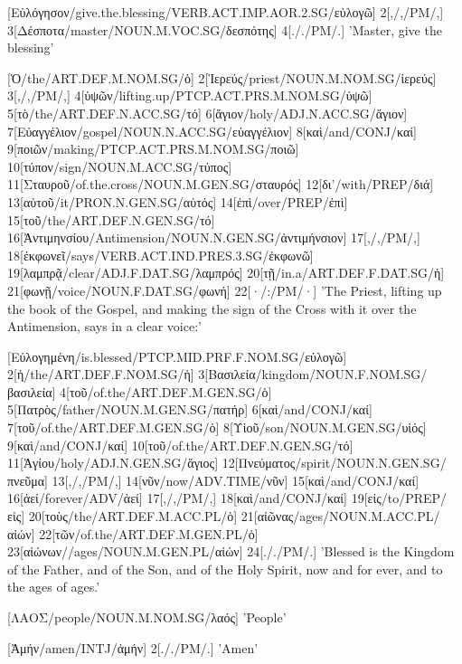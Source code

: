 \documentclass[extrafontsizes,17pt]{memoir}
\begin{document}
\a

[Εὐλόγησον/give.the.blessing/VERB.ACT.IMP.AOR.2.SG/εὐλογῶ] 
2[,/,/PM/,]
3[Δέσποτα/master/NOUN.M.VOC.SG/δεσπότης]
4[././PM/.]
\glft
'Master, give the blessing'
\endgl

\a

[Ὁ/the/ART.DEF.M.NOM.SG/ὁ]
2[Ἱερεύς/priest/NOUN.M.NOM.SG/ἱερεύς]
3[,/,/PM/,]
4[ὑψῶν/lifting.up/PTCP.ACT.PRS.M.NOM.SG/ὑψῶ]
5[τὸ/the/ART.DEF.N.ACC.SG/τό]
6[ἅγιον/holy/ADJ.N.ACC.SG/ἅγιον]
7[Εὐαγγέλιον/gospel/NOUN.N.ACC.SG/εὐαγγέλιον]
8[καὶ/and/CONJ/καί]
9[ποιῶν/making/PTCP.ACT.PRS.M.NOM.SG/ποιῶ]
10[τύπον/sign/NOUN.M.ACC.SG/τύπος]
11[Σταυροῦ/of.the.cross/NOUN.M.GEN.SG/σταυρός]
12[δι'/with/PREP/διά]
13[αὐτοῦ/it/PRON.N.GEN.SG/αὐτός]
14[ἐπὶ/over/PREP/ἐπὶ]
15[τοῦ/the/ART.DEF.N.GEN.SG/τό]
16[Ἀντιμηνσίου/Antimension/NOUN.N.GEN.SG/ἀντιμήνσιον]
17[,/,/PM/,]
18[ἐκφωνεῖ/says/VERB.ACT.IND.PRES.3.SG/ἐκφωνῶ]
19[λαμπρᾷ/clear/ADJ.F.DAT.SG/λαμπρός]
20[τῇ/in.a/ART.DEF.F.DAT.SG/ἡ]
21[φωνῇ/voice/NOUN.F.DAT.SG/φωνή]
22[·/:/PM/·]
\glft
'The Priest, lifting up the book of the Gospel, and
making the sign of the Cross with it over the Antimension,
says in a clear voice:'
\endgl

\a

[Εὐλογημένη/is.blessed/PTCP.MID.PRF.F.NOM.SG/εὐλογῶ]
2[ἡ/the/ART.DEF.F.NOM.SG/ἡ]
3[Βασιλεία/kingdom/NOUN.F.NOM.SG/βασιλεία]
4[τοῦ/of.the/ART.DEF.M.GEN.SG/ὁ]
5[Πατρὸς/father/NOUN.M.GEN.SG/πατήρ]
6[καὶ/and/CONJ/καί]
7[τοῦ/of.the/ART.DEF.M.GEN.SG/ὁ] 
8[Υἱοῦ/son/NOUN.M.GEN.SG/υἱός]
9[καὶ/and/CONJ/καί]
10[τοῦ/of.the/ART.DEF.N.GEN.SG/τό]
11[Ἁγίου/holy/ADJ.N.GEN.SG/ἅγιος]
12[Πνεύματος/spirit/NOUN.N.GEN.SG/πνεῦμα]
13[,/,/PM/,]
14[νῦν/now/ADV.TIME/νῦν]
15[καὶ/and/CONJ/καί]
16[ἀεί/forever/ADV/ἀεί]
17[,/,/PM/,]
18[καὶ/and/CONJ/καί] 
19[εἰς/to/PREP/εἰς]
20[τοὺς/the/ART.DEF.M.ACC.PL/ὁ]
21[αἰῶνας/ages/NOUN.M.ACC.PL/αἰών]
22[τῶν/of.the/ART.DEF.M.GEN.PL/ὁ]
23[αἰώνων//ages/NOUN.M.GEN.PL/αἰών]
24[././PM/.]
\glft
'Blessed is the Kingdom of the Father, and of the
Son, and of the Holy Spirit, now and for ever, and
to the ages of ages.'
\endgl

\a

[ΛΑΟΣ/people/NOUN.M.NOM.SG/λαός]
\glft
'People'
\endgl

\a

[Ἀμήν/amen/INTJ/ἀμήν]
2[././PM/.]
\glft
'Amen'
\endgl



















\xe

\endgroup
\end{document}
